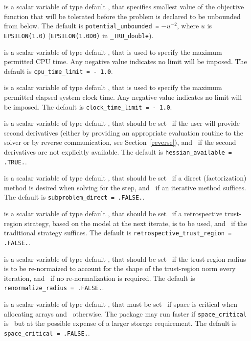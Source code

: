\documentclass{galahad}
\newcommand{\packagename}{TRU}
\newcommand{\fullpackagename}{\libraryname\_\packagename}
\begin{document}
\begin{description}
  is a scalar variable of type default
\realdp, that specifies smallest
value of the objective function that will be tolerated before the problem
is declared to be unbounded from below.
The default is {\tt potential\_u\-nbounded =} $-u^{-2}$,
where $u$ is {\tt EPSILON(1.0)} ({\tt EPSILON(1.0D0)} in
{\tt \fullpackagename\_double}).

 is a scalar variable of type default \realdp,
that is used to specify the maximum permitted CPU time. Any negative
value indicates no limit will be imposed. The default is
{\tt cpu\_time\_limit = - 1.0}.

 is a scalar variable of type default \realdp,
that is used to specify the maximum permitted elapsed system clock time.
Any negative value indicates no limit will be imposed. The default is
{\tt clock\_time\_limit = - 1.0}.

is a scalar variable of type default \logical,
that should be set \true\ if the user will provide second derivatives
(either by providing an appropriate evaluation routine to the solver
or by reverse communication, see Section~\ref{reverse}), and
\false\ if the second derivatives are not explicitly available.
The default is {\tt hessian\_available = .TRUE.}.

is a scalar variable of type default \logical,
that should be set \true\ if a direct (factorization) method is
desired when solving for the step, and \false\ if an iterative
method suffices.
The default is {\tt subproblem\_direct = .FALSE.}.

is a scalar variable of type default \logical,
that should be set \true\ if a retrospective trust-region
strategy, based on the model at the next iterate, is to be used,
and \false\ if the traditional strategy suffices.
The default is {\tt  retrospective\_trust\_region = .FALSE.}.

is a scalar variable of type default \logical,
that should be set \true\ if the trust-region radius is to be
re-normaized to account for the shape of the trust-region norm
every iteration, and \false\ if no re-normalization is required.
The default is {\tt renormalize\_radius = .FALSE.}.

 is a scalar variable of type default \logical,
that must be set \true\ if space is critical when allocating arrays
and  \false\ otherwise. The package may run faster if
{\tt space\_critical} is \false\ but at the possible expense of a larger
storage requirement. The default is {\tt space\_critical = .FALSE.}.


\end{description}
\end{document}
